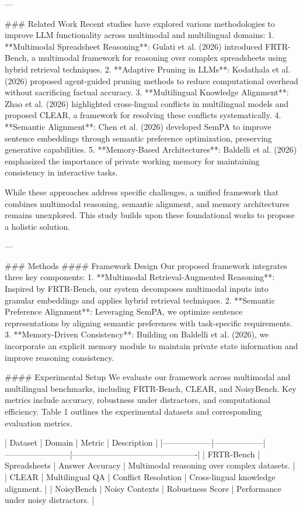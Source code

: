 ---

### Related Work  
Recent studies have explored various methodologies to improve LLM functionality across multimodal and multilingual domains:  
1. **Multimodal Spreadsheet Reasoning**: Gulati et al. (2026) introduced FRTR-Bench, a multimodal framework for reasoning over complex spreadsheets using hybrid retrieval techniques.  
2. **Adaptive Pruning in LLMs**: Kodathala et al. (2026) proposed agent-guided pruning methods to reduce computational overhead without sacrificing factual accuracy.  
3. **Multilingual Knowledge Alignment**: Zhao et al. (2026) highlighted cross-lingual conflicts in multilingual models and proposed CLEAR, a framework for resolving these conflicts systematically.  
4. **Semantic Alignment**: Chen et al. (2026) developed SemPA to improve sentence embeddings through semantic preference optimization, preserving generative capabilities.  
5. **Memory-Based Architectures**: Baldelli et al. (2026) emphasized the importance of private working memory for maintaining consistency in interactive tasks.  

While these approaches address specific challenges, a unified framework that combines multimodal reasoning, semantic alignment, and memory architectures remains unexplored. This study builds upon these foundational works to propose a holistic solution.

---

### Methods  
#### Framework Design  
Our proposed framework integrates three key components:  
1. **Multimodal Retrieval-Augmented Reasoning**: Inspired by FRTR-Bench, our system decomposes multimodal inputs into granular embeddings and applies hybrid retrieval techniques.  
2. **Semantic Preference Alignment**: Leveraging SemPA, we optimize sentence representations by aligning semantic preferences with task-specific requirements.  
3. **Memory-Driven Consistency**: Building on Baldelli et al. (2026), we incorporate an explicit memory module to maintain private state information and improve reasoning consistency.

#### Experimental Setup  
We evaluate our framework across multimodal and multilingual benchmarks, including FRTR-Bench, CLEAR, and NoisyBench. Key metrics include accuracy, robustness under distractors, and computational efficiency. Table 1 outlines the experimental datasets and corresponding evaluation metrics.

| Dataset         | Domain           | Metric                 | Description                                  |
|------------------|------------------|------------------------|----------------------------------------------|
| FRTR-Bench      | Spreadsheets     | Answer Accuracy        | Multimodal reasoning over complex datasets. |
| CLEAR           | Multilingual QA  | Conflict Resolution    | Cross-lingual knowledge alignment.          |
| NoisyBench      | Noisy Contexts   | Robustness Score       | Performance under noisy distractors.        |

